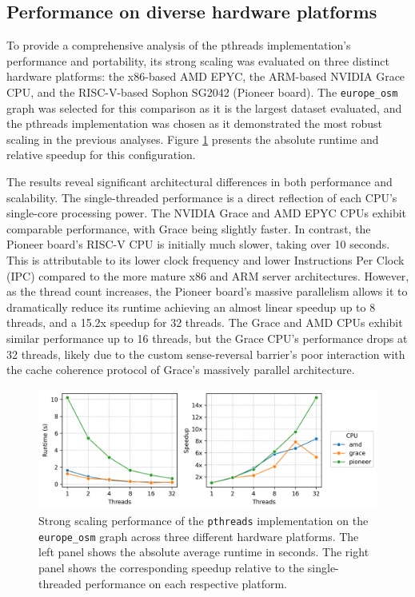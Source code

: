 \subsection{Performance on diverse hardware platforms}
\label{sec:otherplatforms}

To provide a comprehensive analysis of the pthreads implementation's performance and portability, its strong scaling was evaluated on three distinct hardware platforms: the x86-based AMD EPYC, the ARM-based NVIDIA Grace CPU, and the RISC-V-based Sophon SG2042 (Pioneer board). The \texttt{europe\_osm} graph was selected for this comparison as it is the largest dataset evaluated, and the pthreads implementation was chosen as it demonstrated the most robust scaling in the previous analyses. Figure \cref{fig:platform_comparison} presents the absolute runtime and relative speedup for this configuration.

The results reveal significant architectural differences in both performance and scalability. The single-threaded performance is a direct reflection of each CPU's single-core processing power. The NVIDIA Grace and AMD EPYC CPUs exhibit comparable performance, with Grace being slightly faster. In contrast, the Pioneer board's RISC-V CPU is initially much slower, taking over 10 seconds. This is attributable to its lower clock frequency and lower Instructions Per Clock (IPC) compared to the more mature x86 and ARM server architectures. However, as the thread count increases, the Pioneer board's massive parallelism allows it to dramatically reduce its runtime achieving an almost linear speedup up to 8 threads, and a 15.2x speedup for 32 threads. The Grace and AMD CPUs exhibit similar performance up to 16 threads, but the Grace CPU's performance drops at 32 threads, likely due to the custom sense-reversal barrier's poor interaction with the cache coherence protocol of Grace's massively parallel architecture.

\begin{figure}[h!]
\centering
\includegraphics[width=0.95\linewidth]{images/other_platforms.png}
\caption{Strong scaling performance of the \texttt{pthreads} implementation on the \texttt{europe\_osm} graph across three different hardware platforms. The left panel shows the absolute average runtime in seconds. The right panel shows the corresponding speedup relative to the single-threaded performance on each respective platform.}
\label{fig:platform_comparison}
\end{figure}